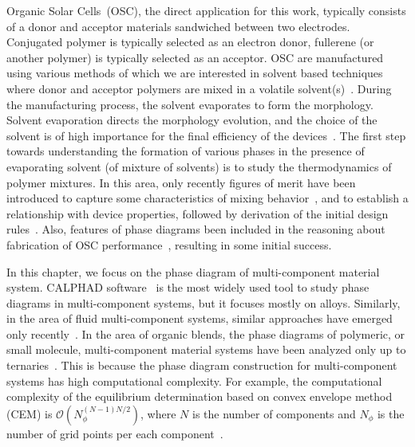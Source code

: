 Organic Solar Cells~(OSC), the direct application for this work, typically consists of a donor and acceptor materials sandwiched between two electrodes.
Conjugated polymer is typically selected as an electron donor, fullerene (or another polymer) is typically selected as an acceptor. 
OSC are manufactured using various methods of which we are interested in solvent based techniques where donor and acceptor polymers are mixed in a volatile solvent(s)~\cite{krebs2009fabrication}. 
During the manufacturing process, the solvent evaporates to form the morphology. 
Solvent evaporation directs the morphology evolution, and the choice of the solvent is of high importance for the final efficiency of the devices~\cite{Shaheen2001}. 
The first step towards understanding the formation of various phases in the presence of evaporating solvent (of mixture of solvents) is to study the thermodynamics of polymer mixtures. 
In this area, only recently figures of merit have been introduced to capture some characteristics of mixing behavior~\cite{ye2018miscibility}, and to establish a relationship with device properties, followed by derivation of the initial design rules~\cite{ye2018}. Also, features of phase diagrams been included in the reasoning about fabrication of OSC performance~\cite{tashvigh2015novel,li2011determination}, resulting in some initial success. 

In this chapter, we focus on the phase diagram of multi-component material system.
CALPHAD software~\cite{sundman2015opencalphad} is the most widely used tool to study phase diagrams in multi-component systems, but it focuses mostly on alloys. 
Similarly, in the area of fluid multi-component systems, similar approaches have emerged only recently~\cite{SoftMatterCEM,voskov2015ternapi}. 
In the area of organic blends, the phase diagrams of polymeric, or small molecule, multi-component material systems have been analyzed only up to ternaries~\cite{NBB07,li2011determination}. 
This is because the phase diagram construction for multi-component systems has high computational complexity. 
For example, the computational complexity of the equilibrium determination based on convex envelope method (CEM) is
\(\mathcal{O}(N_{\phi}^{(N-1)N/2})\), where \(N\) is the number of components and \(N_{\phi}\) is the number of grid points per each component~\cite{SoftMatterCEM,voskov2015ternapi}.


